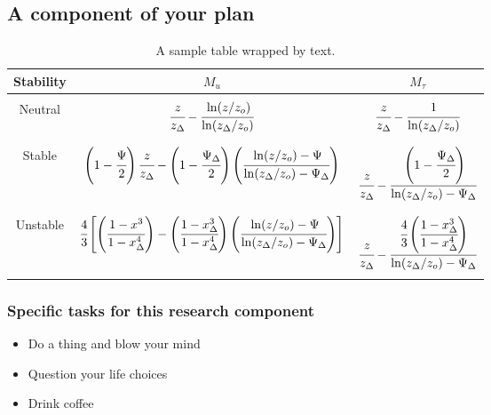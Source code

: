 \subsection{A component of your plan}




\begin{table}
\label{table1}
\caption{A sample table wrapped by text.}
\begin{center}
\vspace{-10pt}
\scriptsize
\begin{tabular}{  c  c  c  }
\hline
\hline
Stability & $M_u$ & $M_{\tau}$ \\
\hline\hline\\
Neutral & $\cfrac{z}{z_\Delta} - \cfrac{\ln(z/z_o)}{\ln(z_\Delta/z_o)}$ & $\cfrac{z}{z_\Delta} - \cfrac{1}{\ln(z_\Delta/z_o)}$\\\\
\hline \\
Stable & $\left(1 - \cfrac{\Psi}{2}\right)\cfrac{z}{z_\Delta} - \left(1 - \cfrac{\Psi_\Delta}{2}\right)
\left(\cfrac{\ln(z/z_o)-\Psi}{\ln(z_\Delta/z_o)- \Psi_\Delta}\right)$ & $\cfrac{z}{z_\Delta} - \cfrac{\left(1 - \cfrac{\Psi_\Delta}{2}\right)}{\ln(z_\Delta/z_o) - \Psi_\Delta}$\\\\
\hline \\
Unstable & $\cfrac{4}{3}\left[\left(\cfrac{1-x^3}{1-x_{\Delta}^{4}}\right) -  \left(\cfrac{1-x_{\Delta}^3}{1 - x_{\Delta}^{4}}\right)\left(\cfrac{\ln(z/z_o)-\Psi}{\ln(z_\Delta/z_o)- \Psi_\Delta}\right)\right]$ & $\cfrac{z}{z_\Delta} - \cfrac{\cfrac{4}{3}\left(\cfrac{1-x_{\Delta}^3}{1 - x_{\Delta}^{4}}\right)}{\ln(z_\Delta/z_o) - \Psi_\Delta}$\\\\
\hline
\hline
\end{tabular}
\end{center}
\end{table}



\subsubsection{Specific tasks for this research component}
\begin{itemize}
\setlength\itemsep{0em}
\item Do a thing and blow your mind
\item Question your life choices
\item Drink coffee
\end{itemize}

